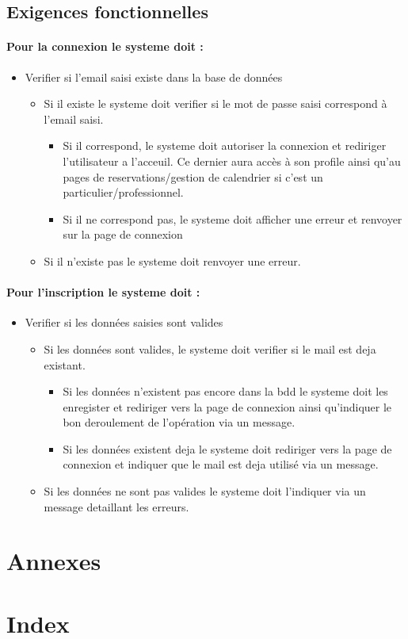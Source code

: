 \documentclass{article}
\begin{document}
\subsection{Exigences fonctionnelles}
\paragraph{Pour la connexion le systeme doit : }

\begin{itemize}
\item Verifier si l'email saisi existe dans la base de données
\begin{itemize}
\item Si il existe le systeme doit verifier si le mot de passe saisi
   correspond à l'email saisi.
\begin{itemize}
     \item Si il correspond, le systeme doit autoriser la connexion et
     rediriger l'utilisateur a l'acceuil. Ce dernier aura accès à son
     profile ainsi qu'au pages de reservations/gestion de calendrier
     si c'est un particulier/professionnel.
    \item Si il ne correspond pas, le systeme doit afficher une erreur
      et renvoyer sur la page de connexion
\end{itemize}
  \item Si il n'existe pas le systeme doit renvoyer une erreur.
\end{itemize}
\end{itemize}

\paragraph{Pour l'inscription le systeme doit : }
\begin{itemize}
\item Verifier si les données saisies sont valides
\begin{itemize}
\item Si les données sont valides, le systeme doit verifier si le mail
  est deja existant.
\begin{itemize}
     \item Si les données n'existent pas encore dans la bdd le systeme
       doit les enregister et rediriger vers la page de connexion
       ainsi qu'indiquer le bon deroulement de l'opération via un message.
    \item Si les données existent deja le systeme doit rediriger vers
      la page de connexion et indiquer que le mail est deja utilisé
      via un message.
\end{itemize}
  \item Si les données ne sont pas valides le systeme doit l'indiquer
    via un message detaillant les erreurs.
\end{itemize}
\end{itemize}




\section{Annexes}


\section{Index}
\end{document}
